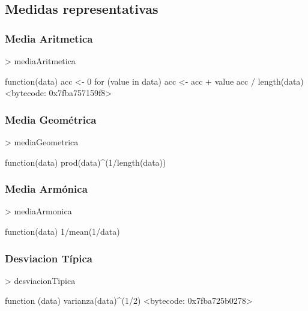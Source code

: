 \documentclass [a4paper] {article}
\begin{document}
\subsection{Medidas representativas}
\subsubsection{Media Aritmetica}
\begin{Schunk}
\begin{Sinput}
> mediaAritmetica
\end{Sinput}
\begin{Soutput}
function(data){
  acc <- 0
  for (value in data) {
    acc <- acc + value
  }
  acc / length(data)
}
<bytecode: 0x7fba757159f8>
\end{Soutput}
\end{Schunk}
\subsubsection{Media Geométrica}
\begin{Schunk}
\begin{Sinput}
> mediaGeometrica
\end{Sinput}
\begin{Soutput}
function(data){
  prod(data)^(1/length(data))
}
\end{Soutput}
\end{Schunk}
\subsubsection{Media Armónica}
\begin{Schunk}
\begin{Sinput}
> mediaArmonica
\end{Sinput}
\begin{Soutput}
function(data){
  1/mean(1/data)
}
\end{Soutput}
\end{Schunk}
\subsubsection{Desviacion Típica}
\begin{Schunk}
\begin{Sinput}
> desviacionTipica
\end{Sinput}
\begin{Soutput}
function (data) {
  varianza(data)^(1/2)
}
<bytecode: 0x7fba725b0278>
\end{Soutput}
\end{Schunk}
\end{document}
